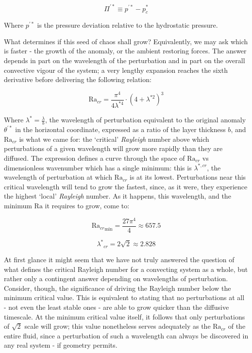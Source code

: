 \documentclass[a4paper,11pt,oneside]{book}
\begin{document}
\begin{equation}
\Pi^{'*} \equiv p^{'*} - p_c^*
\end{equation}

Where $p^{'*}$ is the pressure deviation relative to the hydrostatic pressure.

What determines if this seed of chaos shall grow? Equivalently, we may ask which is faster - the growth of the anomaly, or the ambient restoring forces. The answer depends in part on the wavelength of the perturbation and in part on the overall convective vigour of the system; a very lengthy expansion \cite{Schubert2001-ea} reaches the sixth derivative before delivering the following relation:

\begin{equation}
\mathrm{Ra}_{cr} = \frac{\pi^4}{4\lambda^{*4}} \cdot \left( 4 + \lambda^{*2} \right) ^3
\end{equation}

Where $\lambda^*=\frac{\lambda}{b}$, the wavelength of perturbation equivalent to the original anomaly $\theta^{'*}$ in the horizontal coordinate, expressed as a ratio of the layer thickness $b$, and $\mathrm{Ra}_{cr}$ is what we came for: the `critical' \textit{Rayleigh} number above which perturbations of a given wavelength will grow more rapidly than they are diffused. The expression defines a curve through the space of $\mathrm{Ra}_{cr}$ vs dimensionless wavenumber which has a single minimum: this is $\lambda^{*, cr}$, the wavelength of perturbation at which $\mathrm{Ra}_{cr}$ is at its lowest. Perturbations near this critical wavelength will tend to grow the fastest, since, as it were, they experience the highest `local' \textit{Rayleigh} number. As it happens, this wavelength, and the minimum $\mathrm{Ra}$ it requires to grow, come to:

\begin{equation}
{\mathrm{Ra}_{cr}}_{\min} = \frac{27\pi^4}{4} \approx 657.5
\end{equation}

\begin{equation}
{\lambda^{*}}_{cr} = 2 \sqrt{2} \approx 2.828
\end{equation}

At first glance it might seem that we have not truly answered the question of what defines the critical Rayleigh number for a convecting system as a whole, but rather only a contingent answer depending on wavelengths of perturbation. Consider, though, the significance of driving the Rayleigh number below the minimum critical value. This is equivalent to stating that no perturbations at all - not even the least stable ones - are able to grow quicker than the diffusive timescale. At the minimum critical value itself, it follows that only perturbations of $\sqrt{2}$ scale will grow; this value nonetheless serves adequately as the $\mathrm{Ra}_{cr}$ of the entire fluid, since a perturbation of such a wavelength can always be discovered in any real system - if geometry permits.
\end{document}
